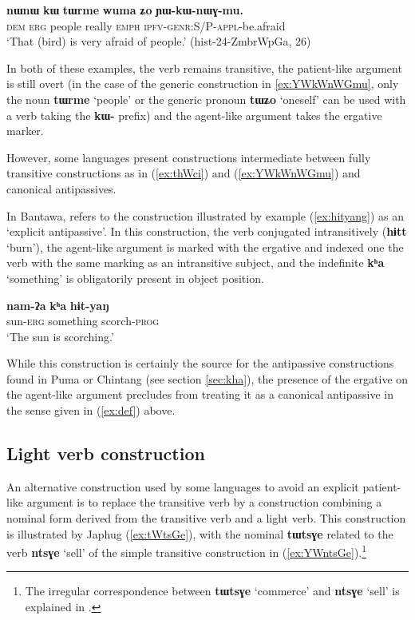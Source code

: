 \documentclass[oneside,a4paper,11pt]{article}
\newcommand{\ipa}[1]{{\phon\textbf{#1}}}
\begin{document}
\begin{exe}
\ex  \label{ex:YWkWnWGmu}
\gll
\ipa{nɯnɯ} 	\ipa{kɯ} 	\ipa{tɯrme} 	\ipa{wuma} 	\ipa{ʑo} 	\ipa{ɲɯ-kɯ-nɯɣ-mu.} \\
\textsc{dem} \textsc{erg} people really \textsc{emph} \textsc{ipfv-genr:S/P-appl}-be.afraid \\
\glt `That (bird) is very afraid of people.' (hist-24-ZmbrWpGa, 26)
\end{exe}

In both of these examples, the verb remains transitive, the patient-like argument is still overt (in the case of the generic construction in \ref{ex:YWkWnWGmu}, only the noun \ipa{tɯrme} `people' or the generic pronoun \ipa{tɯʑo} `oneself' can be used with a verb taking the \ipa{kɯ-} prefix)  and the agent-like argument takes the ergative marker.

However, some languages present constructions intermediate between fully transitive constructions as in (\ref{ex:thWci}) and (\ref{ex:YWkWnWGmu}) and canonical antipassives. 

In Bantawa, \citet[226;335]{doornenbal09} refers to the construction illustrated by example (\ref{ex:hityang}) as an `explicit antipassive'. In this construction, the verb conjugated intransitively (\ipa{hɨtt} `burn'), the agent-like argument is marked with the ergative and indexed one the verb with the same marking as an intransitive subject, and the indefinite \ipa{kʰa} `something' is obligatorily present in object position.

\begin{exe}
\ex \label{ex:hityang}
\gll 
\ipa{nam-ʔa} \ipa{kʰa} \ipa{hɨt-yaŋ} \\
sun-\textsc{erg} something scorch-\textsc{prog} \\
\glt ‘The sun is scorching.’
\end{exe}

While this construction is certainly the source for the antipassive constructions found in Puma or Chintang (see section \ref{sec:kha}), the presence of the ergative on the agent-like argument precludes from treating it as a canonical antipassive in the sense given in (\ref{ex:def}) above.

\subsection{Light verb construction} \label{sec:light}
An alternative construction used by some languages to avoid an explicit patient-like argument is to replace the transitive verb by a construction combining a nominal form derived from the transitive verb and a light verb. This construction is illustrated by Japhug (\ref{ex:tWtsGe}), with the nominal \ipa{tɯtsɣe} related to the verb \ipa{ntsɣe} `sell' of the simple transitive construction in (\ref{ex:YWntsGe}).\footnote{The irregular correspondence between \ipa{tɯtsɣe} `commerce' and \ipa{ntsɣe} `sell' is explained in \citet{jacques14antipassive}. }
\end{document}
